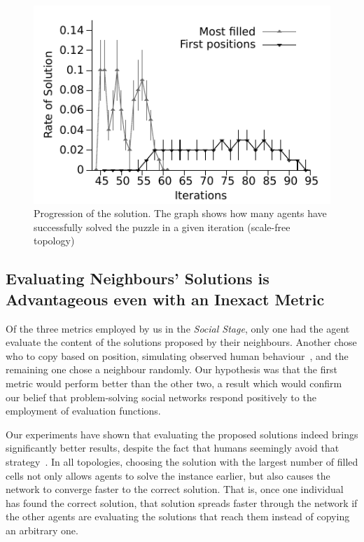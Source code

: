 \documentclass{article}
\begin{document}
\begin{figure}
\includegraphics[scale=1]{ijcai_sudoku/geral}
\caption{Progression of the solution. The graph shows how many agents have successfully solved the puzzle in a given iteration (scale-free topology)}
\label{fig:global_gauss}
\end{figure}

\subsection{Evaluating Neighbours' Solutions is Advantageous even with an Inexact Metric}

Of the three metrics employed by us in the \emph{Social Stage}, only one had the agent evaluate the content of the solutions proposed by their neighbours. Another chose who to copy based on position, simulating observed human behaviour~\cite{farenzena:collabem}, and the remaining one chose a neighbour randomly. Our hypothesis was that the first metric would perform better than the other two, a result which would confirm our belief that problem-solving social networks respond positively to the employment of evaluation functions.

Our experiments have shown that evaluating the proposed solutions indeed brings significantly better results, despite the fact that humans seemingly avoid that strategy~\cite{farenzena:collabem}. In all topologies, choosing the solution with the largest number of filled cells not only allows agents to solve the instance earlier, but also causes the network to converge faster to the correct solution. That is, once one individual has found the correct solution, that solution spreads faster through the network if the other agents are evaluating the solutions that reach them instead of copying an arbitrary one.
\end{document}
